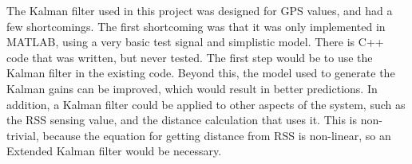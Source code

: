 The Kalman filter used in this project was designed for GPS values, and had a few shortcomings.
The first shortcoming was that it was only implemented in MATLAB, using a very basic
test signal and simplistic model. There is C++ code that was written, but never tested.
The first step would be to use the Kalman filter in the existing code. Beyond this,
the model used to generate the Kalman gains can be improved, which would result in better 
predictions. In addition, a Kalman filter could be applied to other aspects of the 
system, such as the RSS sensing value, and the distance calculation that uses it.
This is non-trivial, because the equation for getting distance from RSS is non-linear,
so an Extended Kalman filter would be necessary. 
